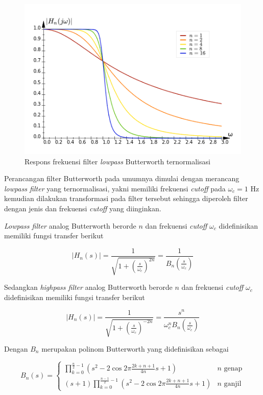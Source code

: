 \documentclass[11pt]{article}
\begin{document}
\begin{figure}[H]
\centerline{\includegraphics[scale=0.5]{figures/fig10-butterlpfresponse.png}}
\caption{Respons frekuensi filter \textit{lowpass} Butterworth ternormalisasi}
\end{figure}

Perancangan filter Butterworth pada umumnya dimulai dengan merancang \textit{lowpass filter} yang ternormalisasi, yakni memiliki frekuensi \textit{cutoff} pada $\omega_c = 1$ Hz kemudian dilakukan transformasi pada filter tersebut sehingga diperoleh filter dengan jenis dan frekuensi \textit{cutoff} yang diinginkan. 

\textit{Lowpass filter} analog Butterworth berorde $n$ dan frekuensi \textit{cutoff} $\omega_c$ didefinisikan memiliki fungsi transfer berikut
    
\begin{equation}
    |H_n(s)| = \frac{1}{\sqrt{1 + (\frac{s}{\omega_c})^{2n}}} = \frac{1}{B_n (\frac{s}{\omega_c})}
\end{equation}

Sedangkan \textit{highpass filter} analog Butterworth berorde $n$ dan frekuensi \textit{cutoff} $\omega_c$ didefinisikan memiliki fungsi transfer berikut

\begin{equation}
    |H_n(s)| = \frac{1}{\sqrt{1 + (\frac{s}{\omega_c})^{-2n}}} = \frac{s^n}{\omega_c^n B_n (\frac{s}{\omega_c})}
\end{equation}

Dengan $B_n$ merupakan polinom Butterworth yang didefinisikan sebagai

\begin{equation}
    B_n(s) = 
    \left\{
    	\begin{array}{ll}
    		\prod_{k = 0}^{\frac{n}{2} -1} (s^2 - 2 \cos{2 \pi \frac{2k + n + 1}{4n} s + 1})  & \mbox{} n \text{ genap} \\
    		(s + 1) \prod_{k = 0}^{\frac{n-1}{2} -1} (s^2 - 2 \cos{2 \pi \frac{2k + n + 1}{4n} s + 1}) & \mbox{} n \text{ ganjil}
    	\end{array}
    \right.
\end{equation}
\end{document}
